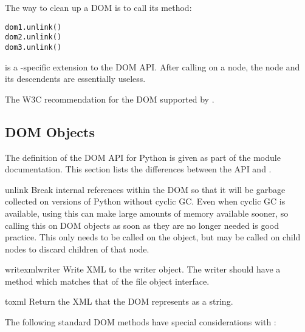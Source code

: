 The way to clean up a DOM is to call its  method:

\begin{verbatim}
dom1.unlink()
dom2.unlink()
dom3.unlink()
\end{verbatim}

 is a -specific extension to
the DOM API.  After calling  on a node, the node and
its descendents are essentially useless.

\begin{seealso}
           {The W3C recommendation for the
            DOM supported by .}
\end{seealso}


\subsection{DOM Objects \label{dom-objects}}

The definition of the DOM API for Python is given as part of the
 module documentation.  This section lists the
differences between the API and .


\begin{methoddesc}{unlink}{}
Break internal references within the DOM so that it will be garbage
collected on versions of Python without cyclic GC.  Even when cyclic
GC is available, using this can make large amounts of memory available
sooner, so calling this on DOM objects as soon as they are no longer
needed is good practice.  This only needs to be called on the
 object, but may be called on child nodes to discard
children of that node.
\end{methoddesc}

\begin{methoddesc}{writexml}{writer}
Write XML to the writer object.  The writer should have a
 method which matches that of the file object
interface.
\end{methoddesc}

\begin{methoddesc}{toxml}{}
Return the XML that the DOM represents as a string.
\end{methoddesc}

The following standard DOM methods have special considerations with
:

